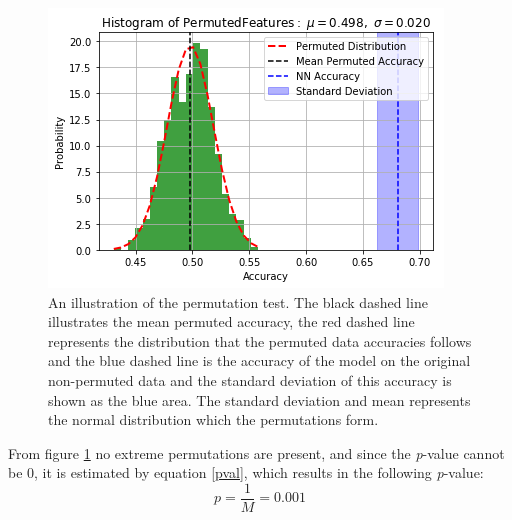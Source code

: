 \documentclass[11pt, fleqn, titlepage]{article}
\begin{document}
	\begin{figure}[H]
			\centering
			\includegraphics[width=0.5\linewidth]{imgs/perm_test.png}
		\caption{An illustration of the permutation test. The black dashed line illustrates the mean permuted accuracy, the red dashed line represents the distribution that the permuted data accuracies follows and the blue dashed line is the accuracy of the model on the original non-permuted data and the standard deviation of this accuracy is shown as the blue area. The standard deviation and mean represents the normal distribution which the permutations form. %
		}
		\label{fig:permtest}
	\end{figure}\noindent
	From figure \ref{fig:permtest} no extreme permutations are present, and since the \textit{p}-value cannot be 0, it is estimated by equation \ref{pval}, which results in the following \textit{p}-value:
	\[p=\frac{1}{M}=0.001\]
	\newpage
\end{document}
